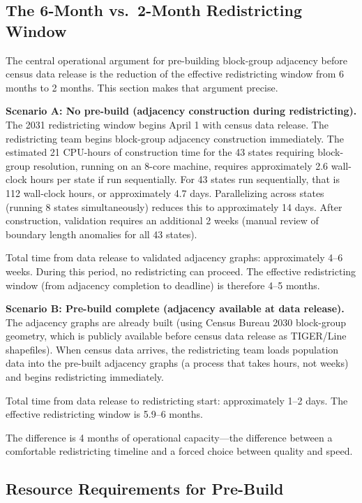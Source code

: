 \label{sec:operational}

\subsection{The 6-Month vs.\ 2-Month Redistricting Window}

The central operational argument for pre-building block-group adjacency before
census data release is the reduction of the effective redistricting window from
6 months to 2 months. This section makes that argument precise.

\textbf{Scenario A: No pre-build (adjacency construction during redistricting).}
The 2031 redistricting window begins April 1 with census data release. The
redistricting team begins block-group adjacency construction immediately.
The estimated 21 CPU-hours of construction time for the 43 states requiring
block-group resolution, running on an 8-core machine, requires approximately
2.6 wall-clock hours per state if run sequentially. For 43 states run sequentially,
that is 112 wall-clock hours, or approximately 4.7 days. Parallelizing across
states (running 8 states simultaneously) reduces this to approximately 14 days.
After construction, validation requires an additional 2 weeks (manual review
of boundary length anomalies for all 43 states).

Total time from data release to validated adjacency graphs: approximately 4--6 weeks.
During this period, no redistricting can proceed. The effective redistricting window
(from adjacency completion to deadline) is therefore 4--5 months.

\textbf{Scenario B: Pre-build complete (adjacency available at data release).}
The adjacency graphs are already built (using Census Bureau 2030 block-group
geometry, which is publicly available before census data release as TIGER/Line
shapefiles). When census data arrives, the redistricting team loads population
data into the pre-built adjacency graphs (a process that takes hours, not weeks)
and begins redistricting immediately.

Total time from data release to redistricting start: approximately 1--2 days.
The effective redistricting window is 5.9--6 months.

The difference is 4 months of operational capacity---the difference between
a comfortable redistricting timeline and a forced choice between quality and speed.

\subsection{Resource Requirements for Pre-Build}

